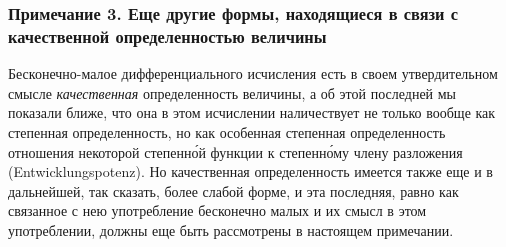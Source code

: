\bigskip

\subsubsection[Примечание 3. Еще другие формы, находящиеся в связи с качественной определенностью величины]
{Примечание 3. Еще другие формы, находящиеся в связи с качественной определенностью величины}
\label{bkm:bm53a}

Бесконечно-малое дифференциального исчисления есть в своем утвердительном
смысле {\em качественная} определенность величины, а об
этой последней мы показали ближе, что она в этом исчислении наличествует не
только вообще как степенная определенность, но как особенная степенная
определенность отношения некоторой степенн\'{о}й функции к степенн\'{о}му члену
разложения (Entwicklungspotenz).
Но качественная определенность
имеется также еще и в дальнейшей, так сказать, более слабой форме, и эта
последняя, равно как связанное с нею употребление бесконечно малых и их
смысл в этом употреблении, должны еще быть рассмотрены в настоящем примечании.


